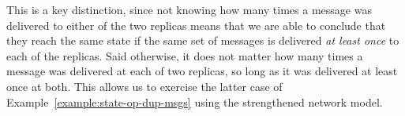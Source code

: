 This is a key distinction, since not knowing how many times a message was
delivered to either of the two replicas means that we are able to conclude that
they reach the same state if the same set of messages is delivered \emph{at
least once} to each of the replicas. Said otherwise, it does not matter how many
times a message was delivered at each of two replicas, so long as it was
delivered at least once at both. This allows us to exercise the latter case of
Example~\ref{example:state-op-dup-msgs} using the strengthened network model.
